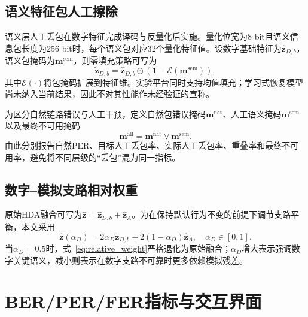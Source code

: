 \documentclass[conference]{IEEEtran}
\begin{document}
\subsection{语义特征包人工擦除}
语义层人工丢包在数字特征完成译码与反量化后实施。量化位宽为8 bit且语义信息包长度为256 bit时，每个语义包对应32个量化特征值。设数字基础特征为$\hat{\bm z}_{D,b}$，语义包掩码为$\bm m^{\mathrm{sem}}$，则零填充策略可写为
\begin{equation}
    \tilde{\bm z}_{D,b}
    =
    \hat{\bm z}_{D,b}\odot
    (\bm 1-\mathcal E(\bm m^{\mathrm{sem}})),
    \label{eq:semantic_erasure}
\end{equation}
其中$\mathcal E(\cdot)$将包掩码扩展到特征维。实验平台同时支持均值填充；学习式恢复模型尚未纳入当前结果，因此不对其性能作未经验证的宣称。

为区分自然链路错误与人工干预，定义自然包错误掩码$\bm m^{\mathrm{nat}}$、人工语义掩码$\bm m^{\mathrm{sem}}$以及最终不可用掩码
\begin{equation}
    \bm m^{\mathrm{all}}
    =
    \bm m^{\mathrm{nat}}\lor\bm m^{\mathrm{sem}}.
    \label{eq:union_mask}
\end{equation}
由此分别报告自然PER、目标人工丢包率、实际人工丢包率、重叠率和最终不可用率，避免将不同层级的“丢包”混为同一指标。

\subsection{数字--模拟支路相对权重}
原始HDA融合可写为$\hat{\bm z}=\hat{\bm z}_{D,b}+\hat{\bm z}_A$。为在保持默认行为不变的前提下调节支路平衡，本文采用
\begin{equation}
    \hat{\bm z}(\alpha_D)
    =2\alpha_D\tilde{\bm z}_{D,b}
    +2(1-\alpha_D)\hat{\bm z}_A,
    \quad \alpha_D\in[0,1].
    \label{eq:relative_weight}
\end{equation}
当$\alpha_D=0.5$时，式~\eqref{eq:relative_weight}严格退化为原始融合；$\alpha_D$增大表示强调数字关键语义，减小则表示在数字支路不可靠时更多依赖模拟残差。

\section{BER/PER/FER指标与交互界面}
\end{document}
